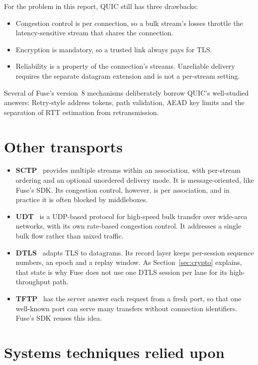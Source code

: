 For the problem in this report, QUIC still has three drawbacks:
\begin{itemize}
  \item Congestion control is per connection, so a bulk stream's losses throttle the latency-sensitive stream
    that shares the connection.
  \item Encryption is mandatory, so a trusted link always pays for TLS.
  \item Reliability is a property of the connection's streams. Unreliable delivery requires the separate
    datagram extension and is not a per-stream setting.
\end{itemize}
Several of Fuse's version~8 mechanisms deliberately borrow QUIC's well-studied answers: Retry-style address
tokens, path validation, AEAD key limits and the separation of RTT estimation from retransmission.

\section{Other transports}

\begin{itemize}
  \item \textbf{SCTP}~\cite{sctp} provides multiple streams within an association, with per-stream ordering and
    an optional unordered delivery mode. It is message-oriented, like Fuse's SDK. Its congestion control,
    however, is per association, and in practice it is often blocked by middleboxes.
  \item \textbf{UDT}~\cite{udt} is a UDP-based protocol for high-speed bulk transfer over wide-area networks,
    with its own rate-based congestion control. It addresses a single bulk flow rather than mixed traffic.
  \item \textbf{DTLS}~\cite{rfc6347,rfc9147} adapts TLS to datagrams. Its record layer keeps per-session
    sequence numbers, an epoch and a replay window. As Section~\ref{sec:crypto} explains, that state is why
    Fuse does not use one DTLS session per lane for its high-throughput path.
  \item \textbf{TFTP}~\cite{rfc1350} has the server answer each request from a fresh port, so that one
    well-known port can serve many transfers without connection identifiers. Fuse's SDK reuses this idea.
\end{itemize}

\section{Systems techniques relied upon}


